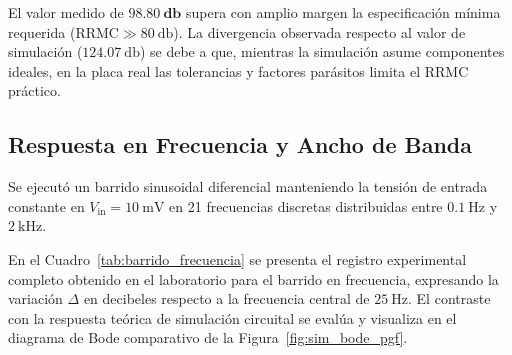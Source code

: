\begin{table}[!ht]
  \centering
  \caption{Comparativa de parámetros de modo diferencial, común y RRMC: valores simulados vs.\ mediciones experimentales en laboratorio.}
  \label{tab:mediciones_rrmc}
\end{table}

El valor medido de $\mathbf{\SI{98.80}{\decibel}}$ supera con amplio margen la
especificación mínima requerida ($\text{RRMC} \gg \SI{80}{\decibel}$). La
divergencia observada respecto al valor de simulación ($\SI{124.07}{\decibel}$)
se debe a que, mientras la simulación asume componentes ideales, en la placa
real las tolerancias y factores parásitos limita el RRMC práctico.

\subsection{Respuesta en Frecuencia y Ancho de Banda}
Se ejecutó un barrido sinusoidal diferencial manteniendo la tensión de entrada constante en $V_{\text{in}} = \SI{10}{\milli\volt}$ en 21 frecuencias discretas distribuidas entre $\SI{0.1}{\hertz}$ y $\SI{2}{\kilo\hertz}$.

En el Cuadro~\ref{tab:barrido_frecuencia} se presenta el registro experimental completo obtenido en el laboratorio para el barrido en frecuencia, expresando la variación $\Delta$ en decibeles respecto a la frecuencia central de $\SI{25}{\hertz}$. El contraste con la respuesta teórica de simulación circuital se evalúa y visualiza en el diagrama de Bode comparativo de la Figura~\ref{fig:sim_bode_pgf}.

